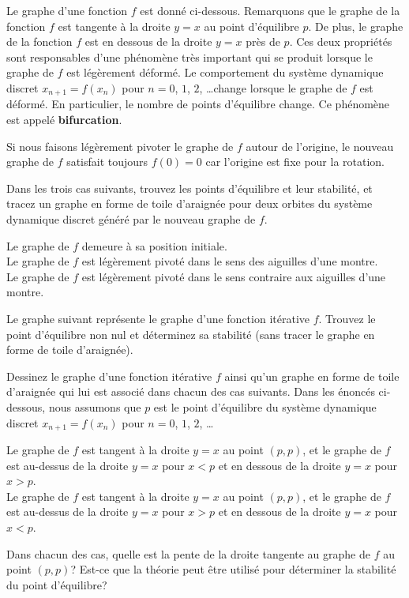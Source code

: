 \begin{question}[\life \theory]
Le graphe d'une fonction $f$ est donné ci-dessous.
Remarquons que le graphe de la fonction $f$ est tangente à la droite
$y=x$ au point d'équilibre $p$.  De plus, le graphe de la fonction $f$
est en dessous de la droite $y=x$ près de $p$.  Ces deux propriétés
sont responsables d'une phénomène très important qui se produit
lorsque le graphe de $f$ est légèrement déformé.  Le comportement du
système dynamique discret $x_{n+1} = f(x_n)$ pour $n=0$, $1$, $2$,
\ldots change lorsque le graphe de $f$ est déformé.  En particulier,
le nombre de points d'équilibre change.  Ce phénomène est appelé
{\bfseries bifurcation}.

Si nous faisons légèrement pivoter le graphe de $f$ autour de l'origine, le
nouveau graphe de $f$ satisfait toujours $f(0)=0$ car l'origine est fixe pour
la rotation.

Dans les trois cas suivants, trouvez les points d'équilibre et leur
stabilité, et tracez un graphe en forme de toile d'araignée pour deux
orbites du système dynamique discret généré par le nouveau graphe de $f$.

 Le graphe de $f$ demeure à sa position initiale.\\
 Le graphe de $f$ est légèrement pivoté dans le sens des aiguilles
d'une montre.\\
 Le graphe de $f$ est légèrement pivoté dans le sens contraire aux
aiguilles d'une montre.
\label{6Q100}
\end{question}

\begin{question}[\life]
Le graphe suivant représente le graphe d'une fonction itérative $f$.
Trouvez le point d'équilibre non nul et déterminez sa stabilité (sans
tracer le graphe en forme de toile d'araignée).
\label{6Q101}
\end{question}

\begin{question}[\life]
Dessinez le graphe d'une fonction itérative $f$ ainsi qu'un graphe en
forme de toile d'araignée qui lui est associé dans chacun des cas
suivants.  Dans les énoncés ci-dessous, nous assumons que $p$ est le point
d'équilibre du système dynamique discret $x_{n+1} = f(x_n)$ pour
$n=0$, $1$, $2$, \ldots

 Le graphe de $f$ est tangent à la droite $y=x$ au point
$(p,p)$, et le graphe de $f$ est au-dessus de la droite $y=x$ pour
$x<p$ et en dessous de la droite $y=x$ pour $x>p$.\\
 Le graphe de $f$ est tangent à la droite $y=x$ au point
$(p,p)$, et le graphe de $f$ est au-dessus de la droite $y=x$ pour
$x>p$ et en dessous de la droite $y=x$ pour $x<p$.

Dans chacun des cas, quelle est la pente de la droite tangente au
graphe de $f$ au point $(p,p)$?  Est-ce que la théorie peut être
utilisé pour déterminer la stabilité du point d'équilibre?
\label{6Q102}
\end{question}

